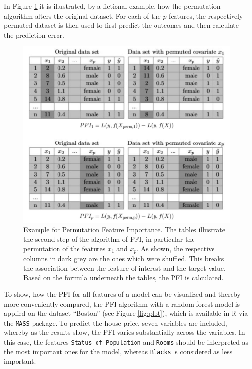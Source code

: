 \documentclass[]{krantz}
\begin{document}
In Figure \ref{fig:PFI} it is illustrated, by a fictional example, how
the permutation algorithm alters the original dataset. For each of the
\(p\) features, the respectively permuted dataset is then used to first
predict the outcomes and then calculate the prediction error.

\begin{figure}

{\centering \includegraphics[width=0.65\linewidth]{images/Permutation_All} 

}

\caption{Example for Permutation Feature Importance. The tables illustrate the second step of the algorithm of PFI, in particular the permutation of the features $x_{1}$ and $x_{p}$. As shown, the respective columns in dark grey are the ones which were shuffled. This breaks the association between the feature of interest and the target value. Based on the formula underneath the tables, the PFI is calculated.}\label{fig:PFI}
\end{figure}

To show, how the PFI for all features of a model can be visualized and
thereby more conveniently compared, the PFI algorithm with a random
forest model is applied on the dataset ``Boston'' (see Figure
\ref{fig:plot}), which is available in R via the \texttt{MASS} package.
To predict the house price, seven variables are included, whereby as the
results show, the PFI varies substantially across the variables. In this
case, the features \texttt{Status\ of\ Population} and \texttt{Rooms}
should be interpreted as the most important ones for the model, whereas
\texttt{Blacks} is considered as less important.
\end{document}
